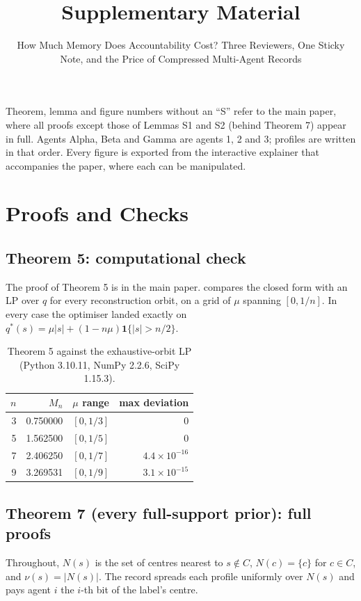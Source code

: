 \documentclass[sigconf,anonymous,acmthm=false]{acmart}
\theoremstyle{acmplain}
\theoremstyle{acmdefinition}
\begin{document}
\title{Supplementary Material}
\subtitle{How Much Memory Does Accountability Cost? Three Reviewers, One Sticky Note, and the Price of Compressed Multi-Agent Records}
\maketitle

Theorem, lemma and figure numbers without an ``S'' refer to the main paper, where all proofs except those of Lemmas S1 and S2 (behind Theorem 7) appear in full. Agents
\textsf{Alpha}, \textsf{Beta} and \textsf{Gamma} are agents 1, 2 and 3; profiles are written
in that order. Every figure is exported from the interactive explainer that accompanies the
paper, where each can be manipulated.

\appendix
\section{Proofs and Checks}

\subsection{Theorem 5: computational check}
The proof of Theorem 5 is in the main paper.  compares the closed form with an
LP over $q$ for every reconstruction orbit, on a grid of $\mu$ spanning $[0,1/n]$. In every case the optimiser landed exactly on
$q^*(s)=\mu|s|+(1-n\mu)\mathbf1\{|s|>n/2\}$.

\begin{table}[h]
\caption{Theorem 5 against the exhaustive-orbit LP (Python 3.10.11, NumPy 2.2.6, SciPy 1.15.3).}
\label{tab:orbit}
\footnotesize
\begin{tabular}{@{}rrlr@{}}
\toprule
$n$ & $M_n$ & $\mu$ range & max deviation\\
\midrule
3 & 0.750000 & $[0,1/3]$ & 0\\
5 & 1.562500 & $[0,1/5]$ & 0\\
7 & 2.406250 & $[0,1/7]$ & $4.4\times10^{-16}$\\
9 & 3.269531 & $[0,1/9]$ & $3.1\times10^{-15}$\\
\bottomrule
\end{tabular}
\end{table}

\subsection{Theorem 7 (every full-support prior): full proofs}
Throughout, $N(s)$ is the set of centres nearest to $s\notin C$, $N(c)=\{c\}$ for $c\in C$,
and $\nu(s)=|N(s)|$. The record spreads each profile uniformly over $N(s)$ and pays agent
$i$ the $i$-th bit of the label's centre.
\end{document}
